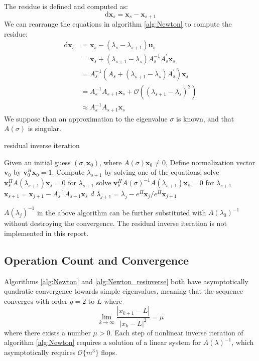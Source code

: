\documentclass[11pt,letterpaper]{article}
\newcommand{\diff}{\mathrm{d}}
\begin{document}
The residue is defined and computed as: 
\begin{equation}\label{eq:residue}
\diff \mathbf{x}_{s} = \mathbf{x}_{s}-\mathbf{x}_{s+1}
\end{equation}
We can rearrange the equations in algorithm \ref{alg:Newton} to compute the residue:
\begin{align*}
\diff \mathbf{x}_{s} &= \mathbf{x}_{s}-(\lambda_{s}-\lambda_{s+1})\mathbf{u}_{s} \\
&=\mathbf{x}_{s}+(\lambda_{s+1}-\lambda_{s})A_{s}^{-1} A^{\prime}_{s}\mathbf{x}_{s} \\
&=A_{s}^{-1} (A_{s} +(\lambda_{s+1}-\lambda_{s})A^{\prime}_{s} )\mathbf{x}_{s}\\
&=A_{s}^{-1} A_{s+1} \mathbf{x}_{s} + \mathcal{O}((\lambda_{s+1}-\lambda_{s})^2 )\\
&\approx A_{s}^{-1} A_{s+1} \mathbf{x}_{s}
\end{align*}
We suppose than an approximation to the eigenvalue $\sigma$ is known, and that $A(\sigma)$ is singular. 
\begin{algorithm}
\caption{residual inverse iteration}
\label{alg:Newton_resinverse}
\begin{algorithmic}
\STATE Given an initial guess $(\sigma, \mathbf{x}_0)$, where $A(\sigma)\mathbf{x}_0\neq 0$, Define normalization vector $\mathbf{v}_0$ by $\mathbf{v}_{0}^{H}\mathbf{x}_0=1$.
\STATE Compute $\lambda_{s+1}$ by solving one of the equations:
    \STATE solve $\mathbf{x}_{s}^{H} A(\lambda_{s+1}) \mathbf{x}_{s} = 0$ for $\lambda_{s+1}$
	\ELSE 
	\STATE solve $\mathbf{v}_{s}^{H}A(\sigma)^{-1}A(\lambda_{s+1})\mathbf{x}_{s}=0$ for $\lambda_{s+1}$
	\ENDIF
\STATE $\mathbf{x}_{s+1} = \mathbf{x}_{j+1} -A_{s}^{-1}A_{s+1}\mathbf{x}_s$
\STATE $d $
\STATE $\lambda_{j+1} = \lambda_j - e^H\mathbf{x}_j/e^H\mathbf{x}_{j+1} $
\ENDFOR
\end{algorithmic}
\end{algorithm}
$A(\lambda_j)^{-1}$ in the above algorithm can be further substituted with $A(\lambda_0)^{-1}$ without destroying the convergence. The residual inverse iteration is not implemented in this report. 

\subsection{Operation Count and Convergence}
Algorithms \ref{alg:Newton} and \ref{alg:Newton_resinverse} both 
have asymptotically quadratic convergence towards simple eigenvalues, meaning that the sequence converges with order $q=2$ to $L$ where 
\begin{equation}\label{eq:quadconv}
    \lim_{k \to \infty} \frac{|x_{k+1}-L|}{|x_k-L|^{2}} = \mu 
\end{equation}
where there exists a number $\mu>0$. Each step of nonlinear inverse iteration of algorithm \ref{alg:Newton} requires a solution of a linear system for $A(\lambda)^{-1}$, which asymptotically requires $\mathcal{O}\{m^3\}$ flops. 
\end{document}
